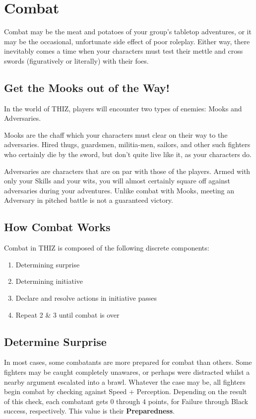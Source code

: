 \documentclass[oneside]{book}
\begin{document}
\chapter{Combat}
\begin{multicols}{2}
Combat may be the meat and potatoes of your group's tabletop adventures, or it may be the occasional, unfortunate side effect of poor roleplay. Either way, there inevitably comes a time when your characters must test their mettle and cross swords (figuratively or literally) with their foes. 

\section{Get the Mooks out of the Way!}
In the world of THIZ, players will encounter two types of enemies: Mooks and Adversaries. 

Mooks are the chaff which your characters must clear on their way to the adversaries. Hired thugs, guardsmen, militia-men, sailors, and other such fighters who certainly die by the sword, but don't quite live like it, as your characters do. 

Adversaries are characters that are on par with those of the players. Armed with only your Skills and your wits, you will almost certainly square off against adversaries during your adventures. Unlike combat with Mooks, meeting an Adversary in pitched battle is not a guaranteed victory. 

\section{How Combat Works}
Combat in THIZ is composed of the following discrete components:
\begin{enumerate}
  \setlength{\itemsep}{0cm}%
  \setlength{\parskip}{0cm}%
  \item Determining surprise
  \item Determining initiative
  \item Declare and resolve actions in initiative passes
  \item Repeat 2 \& 3 until combat is over
\end{enumerate}

\section{Determine Surprise}
In most cases, some combatants are more prepared for combat than others. Some fighters may be caught completely unawares, or perhaps were distracted whilst a nearby argument escalated into a brawl. Whatever the case may be, all fighters begin combat by checking against Speed + Perception. Depending on the result of this check, each combatant gets 0 through 4 points, for Failure through Black success, respectively. This value is their \textbf{Preparedness}.  


\end{multicols}
\end{document}
